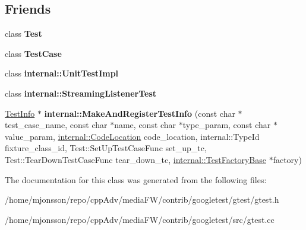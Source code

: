 \subsection*{Friends}
\begin{DoxyCompactItemize}
\item 
\mbox{\label{classtesting_1_1TestInfo_a5b78b1c2e1fa07ffed92da365593eaa4}} 
class {\bfseries Test}
\item 
\mbox{\label{classtesting_1_1TestInfo_aff779e55b06adfa7c0088bd10253f0f0}} 
class {\bfseries Test\+Case}
\item 
\mbox{\label{classtesting_1_1TestInfo_acc0a5e7573fd6ae7ad1878613bb86853}} 
class {\bfseries internal\+::\+Unit\+Test\+Impl}
\item 
\mbox{\label{classtesting_1_1TestInfo_adc037d188dab349a94868991955c9cd4}} 
class {\bfseries internal\+::\+Streaming\+Listener\+Test}
\item 
\mbox{\label{classtesting_1_1TestInfo_a70ddf8a12d8c05f17429f6381abc8ace}} 
\hyperlink{classtesting_1_1TestInfo}{Test\+Info} $\ast$ {\bfseries internal\+::\+Make\+And\+Register\+Test\+Info} (const char $\ast$test\+\_\+case\+\_\+name, const char $\ast$name, const char $\ast$type\+\_\+param, const char $\ast$value\+\_\+param, \hyperlink{structtesting_1_1internal_1_1CodeLocation}{internal\+::\+Code\+Location} code\+\_\+location, internal\+::\+Type\+Id fixture\+\_\+class\+\_\+id, Test\+::\+Set\+Up\+Test\+Case\+Func set\+\_\+up\+\_\+tc, Test\+::\+Tear\+Down\+Test\+Case\+Func tear\+\_\+down\+\_\+tc, \hyperlink{classtesting_1_1internal_1_1TestFactoryBase}{internal\+::\+Test\+Factory\+Base} $\ast$factory)
\end{DoxyCompactItemize}


The documentation for this class was generated from the following files\+:\begin{DoxyCompactItemize}
\item 
/home/mjonsson/repo/cpp\+Adv/media\+F\+W/contrib/googletest/gtest/gtest.\+h\item 
/home/mjonsson/repo/cpp\+Adv/media\+F\+W/contrib/googletest/src/gtest.\+cc\end{DoxyCompactItemize}
